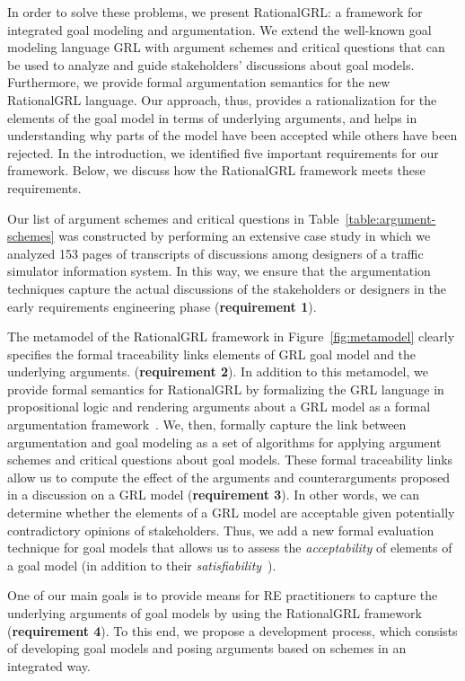 In order to solve these problems, we present RationalGRL: a framework for integrated goal modeling and argumentation. We extend the well-known goal modeling language GRL with argument schemes and critical questions that can be used to analyze and guide stakeholders' discussions about goal models. Furthermore, we provide formal argumentation semantics for the new RationalGRL language. Our approach, thus, provides a rationalization for the elements of the goal model in terms of underlying arguments, and helps in understanding why parts of the model have been accepted while others have been rejected. In the introduction, we identified five important requirements for our framework. Below, we discuss how the RationalGRL framework meets these requirements.

Our list of argument schemes and critical questions in Table~\ref{table:argument-schemes} was constructed by performing an extensive case study in which we analyzed 153 pages of transcripts of discussions among designers of a traffic simulator information system. In this way, we ensure that the argumentation techniques capture the actual discussions of the stakeholders or designers in the early requirements engineering phase (\textbf{requirement 1}).  

The metamodel of the RationalGRL framework in Figure~\ref{fig:metamodel} clearly specifies the formal traceability links elements of GRL goal model and the underlying arguments. (\textbf{requirement 2}). In addition to this metamodel, we provide formal semantics for RationalGRL by formalizing the GRL language in propositional logic and rendering arguments about a GRL model as a formal argumentation framework~\cite{Dung1995}. We, then, formally capture the link between argumentation and goal modeling as a set of algorithms for applying argument schemes and critical questions about goal models. These formal traceability links allow us to compute the effect of the arguments and counterarguments proposed in a discussion on a GRL model (\textbf{requirement 3}). In other words, we can determine whether the elements of a GRL model are acceptable given potentially contradictory opinions of stakeholders. Thus, we add a new formal evaluation technique for goal models that allows us to assess the \emph{acceptability} of elements of a goal model (in addition to their \emph{satisfiability}~\cite{Amyot:2010:EGM:1841349.1841356}).

One of our main goals is to provide means for RE practitioners to capture the underlying arguments of goal models by using the RationalGRL framework (\textbf{requirement 4}). To this end, we propose a development process, which consists of developing goal models and posing arguments based on schemes in an integrated way. 

